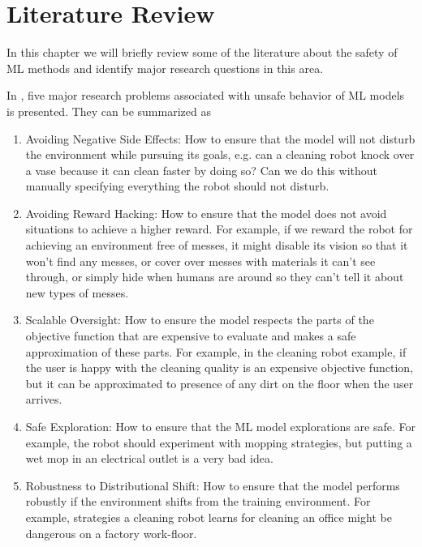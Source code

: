 \chapter{Literature Review}
\label{chap:literature}

In this chapter we will briefly review some of the literature about the safety of ML methods and identify major research questions in this area. 

In \cite{Amodei2016}, five major research problems associated with unsafe behavior of ML models is presented. They can be summarized as
\begin{enumerate}
	\item Avoiding Negative Side Effects: How to ensure that the model will not disturb the environment while pursuing its goals, e.g. can a cleaning robot knock over a vase because it can clean faster by doing so? Can we do this without manually specifying everything the robot should not disturb.
	
	\item Avoiding Reward Hacking: How to ensure that the model does not avoid situations to achieve a higher reward. For example, if we reward the robot for achieving an environment free of messes, it might disable its vision so that it won’t find any messes, or cover over messes with materials it can’t see through, or simply hide when humans are around so they can’t tell it about new types of messes.
	
	\item Scalable Oversight: How to ensure the model respects the parts of the objective function that are expensive to evaluate and makes a safe approximation of these parts. 
	For example, in the cleaning robot example, if the user is happy with the cleaning quality is an expensive objective function, but it can be approximated to presence of any dirt on the floor when the user arrives.
	
	\item Safe Exploration: How to ensure that the ML model explorations are safe. For example, the robot should experiment with mopping strategies, but putting a wet mop in an electrical outlet is a very bad idea.
	
	\item Robustness to Distributional Shift: How to ensure that the model performs robustly if the environment shifts from the training environment. For example, strategies a cleaning robot learns for cleaning an office might be dangerous on a factory work-floor.

\end{enumerate}

